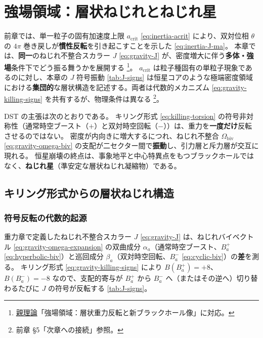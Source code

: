 \documentclass[dvipdfmx,a4paper,oneside]{jsbook}
\numberwithin{equation}{chapter}
\begin{document}
\chapter{強場領域：層状ねじれとねじれ星}

前章では、単一粒子の固有加速度上限 \(a_{\mathrm{crit}}\) \eqref{eq:inertia-acrit} により、双対位相 \(\theta\) の \(4\pi\) 巻き戻しが\textbf{慣性反転}を引き起こすことを示した \eqref{eq:inertia-J-ma}。
本章では、\textbf{同一}のねじれ不整合スカラー \(J\) \eqref{eq:gravity-J} が、密度増大に伴う\textbf{多体・強場}条件下でどう振る舞うかを展開する \footnote{\hyperref[sec:sister-manuscripts]{親理論}「強場領域：層状重力反転と新ブラックホール像」に対応。}。
\(a_{\mathrm{crit}}\) は粒子種固有の単粒子現象であるのに対し、本章の \(J\) 符号振動 \eqref{tab:J-signs} は恒星コアのような極端密度領域における\textbf{集団的}な層状構造を記述する。両者は代数的メカニズム \eqref{eq:gravity-killing-signs} を共有するが、物理条件は異なる \footnote{前章 §5「次章への接続」参照。}。

DST の主張は次のとおりである。
キリング形式 \eqref{eq:killing-torsion} の符号非対称性（通常時空ブースト（\(+\)）と双対時空回転（\(-\)））は、重力を\textbf{一度だけ}反転させるのではない。
密度が内向きに増大するにつれ、ねじれ不整合 \(\Omega_{\mathrm{biv}}\) \eqref{eq:gravity-omega-biv} の支配が二セクター間で\textbf{振動}し、引力層と斥力層が交互に現れる。
恒星崩壊の終点は、事象地平と中心特異点をもつブラックホールではなく、\textbf{ねじれ星}（準安定な層状ねじれ凝縮物）である。

\section{キリング形式からの層状ねじれ構造}

\subsection{符号反転の代数的起源}

重力章で定義したねじれ不整合スカラー \(J\) \eqref{eq:gravity-J} は、ねじれバイベクトル \eqref{eq:gravity-omega-expansion} の双曲成分 \(\alpha_a\)（通常時空ブースト、\(B_a^{+}\) \eqref{eq:hyperbolic-biv}）と巡回成分 \(\beta_a\)（双対時空回転、\(B_a^{-}\) \eqref{eq:cyclic-biv}）の\textbf{差}を測る。
キリング形式 \eqref{eq:gravity-killing-signs} により \(B(B_a^{+}) = +8\)、\(B(B_a^{-}) = -8\) なので、支配的寄与が \(B_a^{+}\) から \(B_a^{-}\) へ（またはその逆へ）切り替わるたびに \(J\) の符号が反転する \eqref{tab:J-signs}。
\end{document}
